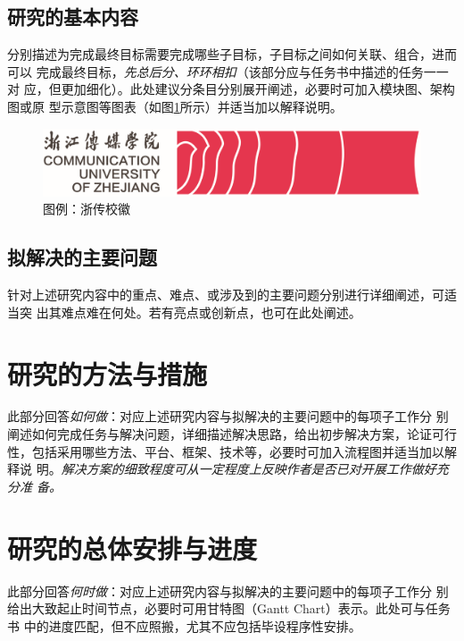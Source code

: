 \subsection{研究的基本内容}

\begin{tcolorbox}
	分别描述为完成最终目标需要完成哪些子目标，子目标之间如何关联、组合，进而可以
	完成最终目标，\emph{先总后分、环环相扣}（该部分应与任务书中描述的任务一一对
	应，但更加细化）。此处建议分条目分别展开阐述，必要时可加入模块图、架构图或原
	型示意图等图表（如图\ref*{fig:1}所示）并适当加以解释说明。
\end{tcolorbox}
\begin{figure}[h]
	\centering
	\includegraphics[width=.6\textwidth]{figures/cuz_logo.png}
	\caption{图例：浙传校徽}
	\label{fig:1}
\end{figure}

\subsection{拟解决的主要问题}

\begin{tcolorbox}
	针对上述研究内容中的重点、难点、或涉及到的主要问题分别进行详细阐述，可适当突
	出其难点难在何处。若有亮点或创新点，也可在此处阐述。
\end{tcolorbox}

\section{研究的方法与措施}

\begin{tcolorbox}
	此部分回答\emph{如何做}：对应上述研究内容与拟解决的主要问题中的每项子工作分
	别阐述如何完成任务与解决问题，详细描述解决思路，给出初步解决方案，论证可行
	性，包括采用哪些方法、平台、框架、技术等，必要时可加入流程图并适当加以解释说
	明。\emph{解决方案的细致程度可从一定程度上反映作者是否已对开展工作做好充分准
		备。}
\end{tcolorbox}

\section{研究的总体安排与进度}

\begin{tcolorbox}
	此部分回答\emph{何时做}：对应上述研究内容与拟解决的主要问题中的每项子工作分
	别给出大致起止时间节点，必要时可用甘特图（Gantt Chart）表示。此处可与任务书
	中的进度匹配，但不应照搬，尤其不应包括毕设程序性安排。
\end{tcolorbox}

